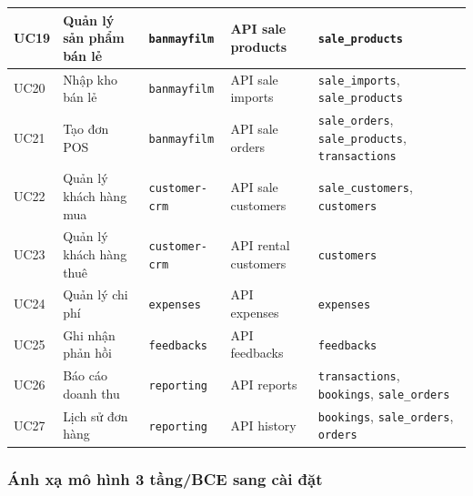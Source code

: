 \begin{table}[H]
{\begin{tabular}{|l|l|l|l|l|}
		\hline
		UC19 & Quản lý sản phẩm bán lẻ & \texttt{banmayfilm} & API sale products & \texttt{sale\_products} \\
		\hline
		UC20 & Nhập kho bán lẻ & \texttt{banmayfilm} & API sale imports & \texttt{sale\_imports}, \texttt{sale\_products} \\
		\hline
		UC21 & Tạo đơn POS & \texttt{banmayfilm} & API sale orders & \texttt{sale\_orders}, \texttt{sale\_products}, \texttt{transactions} \\
		\hline
		UC22 & Quản lý khách hàng mua & \texttt{customer-crm} & API sale customers & \texttt{sale\_customers}, \texttt{customers} \\
		\hline
		UC23 & Quản lý khách hàng thuê & \texttt{customer-crm} & API rental customers & \texttt{customers} \\
		\hline
		UC24 & Quản lý chi phí & \texttt{expenses} & API expenses & \texttt{expenses} \\
		\hline
		UC25 & Ghi nhận phản hồi & \texttt{feedbacks} & API feedbacks & \texttt{feedbacks} \\
		\hline
		UC26 & Báo cáo doanh thu & \texttt{reporting} & API reports & \texttt{transactions}, \texttt{bookings}, \texttt{sale\_orders} \\
		\hline
		UC27 & Lịch sử đơn hàng & \texttt{reporting} & API history & \texttt{bookings}, \texttt{sale\_orders}, \texttt{orders} \\
		\hline
	\end{tabular}
    }
\end{table}

\subsubsection{Ánh xạ mô hình 3 tầng/BCE sang cài đặt}


